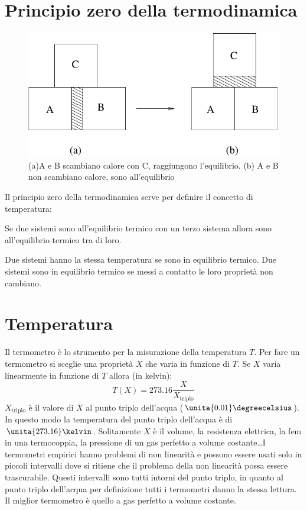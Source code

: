 \section{Principio zero della termodinamica}
\begin{figure}[htbp]
\centering
\includegraphics[scale=0.5]{immagini/fisica1/principio_zero}
\caption{(a)A e B scambiano calore con C, raggiungono l'equilibrio. (b) A e B non scambiano calore, sono all'equilibrio}
\end{figure}
Il principio zero della termodinamica serve per definire il concetto di temperatura:
\begin{Pri}
Se due sistemi sono all'equilibrio termico con un terzo sistema allora sono all'equilibrio termico tra di loro.

Due sistemi hanno la stessa temperatura se sono in equilibrio termico. Due sistemi sono in equilibrio termico se messi a contatto le loro proprietà non cambiano.
\end{Pri}

\section{Temperatura}
Il termometro è lo strumento per la misurazione della temperatura $T$. Per fare un termometro si sceglie una proprietà $X$ che varia in funzione di $T$. Se $X$ varia linearmente in funzione di $T$ allora (in kelvin):
\begin{equation}
T(X)=273.16\frac{X}{X_\text{triplo}}
\end{equation}
$X_\text{triplo}$ è il valore di $X$ al punto triplo dell'acqua ($\unita{0.01}\degreecelsius$). In questo modo la temperatura del punto triplo dell'acqua è di $\unita{273.16}\kelvin$. Solitamente $X$ è il volume, la resistenza elettrica, la fem in una termocoppia, la pressione di un gas perfetto a volume costante\ldots I termometri empirici hanno problemi di non linearità e possono essere usati solo in piccoli intervalli dove si ritiene che il problema della non linearità possa essere trascurabile. Questi intervalli sono tutti intorni del punto triplo, in quanto al punto triplo dell'acqua per definizione tutti i termometri danno la stessa lettura. Il miglior termometro è quello a gas perfetto a volume costante.

